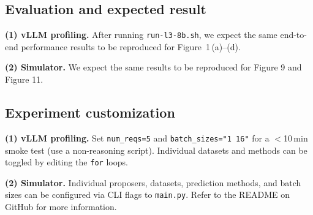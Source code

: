 \documentclass{article}
\begin{document}
\subsection{Evaluation and expected result}

\textbf{(1) vLLM profiling.}
After running \texttt{run-l3-8b.sh}, we expect the same end-to-end performance results to be reproduced for Figure~1\,(a)--(d).

\textbf{(2) Simulator.} We expect the same results to be reproduced for Figure 9 and Figure 11.

\subsection{Experiment customization}

\textbf{(1) vLLM profiling.}
Set \texttt{num\_reqs=5} and \texttt{batch\_sizes="1 16"} for a
$<$10\,min smoke test (use a non-reasoning script).
Individual datasets and methods can be toggled by editing the
\texttt{for} loops.

\textbf{(2) Simulator.}
Individual proposers, datasets, prediction methods, and batch sizes
can be configured via CLI flags to \texttt{main.py}. Refer to the README on GitHub for more information.

\end{document}
